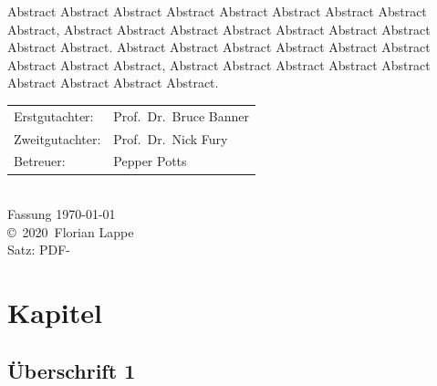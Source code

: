 \documentclass[a4paper,10pt
headsepline,           %
doubleside,            %
pointlessnumbers,      %
bibtotoc,              %
BCOR15mm,               %
leqno					%
]{scrbook}
\newcommand{\fullname}{Florian Lappe}
\newcommand{\jahr}{2020}
\newcommand{\gutachterA}{Prof.\ Dr.\ Bruce Banner}
\newcommand{\gutachterB}{Prof.\ Dr.\ Nick Fury}
\newcommand{\betreuer}{Pepper Potts}
\begin{document}
Abstract Abstract Abstract Abstract Abstract Abstract Abstract Abstract Abstract,
Abstract Abstract Abstract Abstract Abstract Abstract Abstract Abstract Abstract.
Abstract Abstract Abstract Abstract Abstract Abstract Abstract Abstract Abstract,
Abstract Abstract Abstract Abstract Abstract Abstract Abstract Abstract Abstract.
{
	\null
	\small
	\vfill
	\begin{center}
		\begin{tabular}{l l}
			Erstgutachter:  & \gutachterA \\
			Zweitgutachter: & \gutachterB \\
			Betreuer:       & \betreuer \\
		\end{tabular}\\[1cm]
		Fassung \today\\
		  \copyright~\jahr~\fullname\\[0.5em]
		
		Satz: PDF-\LaTeXe
	\end{center}
}


\tableofcontents

\mainmatter %


\chapter{Kapitel}

\section{Überschrift 1}
\end{document}
